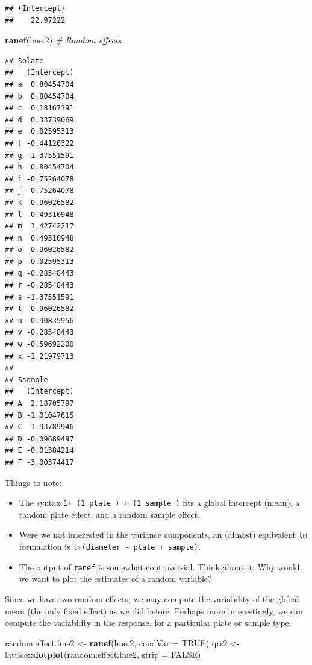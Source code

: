 \documentclass[]{book}
\newenvironment{Shaded}{\begin{snugshade}}{\end{snugshade}}
\newcommand{\KeywordTok}[1]{\textcolor[rgb]{0.13,0.29,0.53}{\textbf{#1}}}
\newcommand{\DataTypeTok}[1]{\textcolor[rgb]{0.13,0.29,0.53}{#1}}
\newcommand{\DecValTok}[1]{\textcolor[rgb]{0.00,0.00,0.81}{#1}}
\newcommand{\StringTok}[1]{\textcolor[rgb]{0.31,0.60,0.02}{#1}}
\newcommand{\CommentTok}[1]{\textcolor[rgb]{0.56,0.35,0.01}{\textit{#1}}}
\newcommand{\OtherTok}[1]{\textcolor[rgb]{0.56,0.35,0.01}{#1}}
\newcommand{\OperatorTok}[1]{\textcolor[rgb]{0.81,0.36,0.00}{\textbf{#1}}}
\newcommand{\NormalTok}[1]{#1}
\providecommand{\tightlist}{%
  \setlength{\itemsep}{0pt}\setlength{\parskip}{0pt}}
\theoremstyle{definition}
\theoremstyle{definition}
\theoremstyle{definition}
\theoremstyle{remark}
\begin{document}
\begin{verbatim}
## (Intercept) 
##    22.97222
\end{verbatim}

\begin{Shaded}
\begin{Highlighting}[]
\KeywordTok{ranef}\NormalTok{(lme.}\DecValTok{2}\NormalTok{) }\CommentTok{# Random effects}
\end{Highlighting}
\end{Shaded}

\begin{verbatim}
## $plate
##   (Intercept)
## a  0.80454704
## b  0.80454704
## c  0.18167191
## d  0.33739069
## e  0.02595313
## f -0.44120322
## g -1.37551591
## h  0.80454704
## i -0.75264078
## j -0.75264078
## k  0.96026582
## l  0.49310948
## m  1.42742217
## n  0.49310948
## o  0.96026582
## p  0.02595313
## q -0.28548443
## r -0.28548443
## s -1.37551591
## t  0.96026582
## u -0.90835956
## v -0.28548443
## w -0.59692200
## x -1.21979713
## 
## $sample
##   (Intercept)
## A  2.18705797
## B -1.01047615
## C  1.93789946
## D -0.09689497
## E -0.01384214
## F -3.00374417
\end{verbatim}

Things to note:

\begin{itemize}
\tightlist
\item
  The syntax
  \texttt{1+\ (1\textbar{}\ plate\ )\ +\ (1\textbar{}\ sample\ )} fits a
  global intercept (mean), a random plate effect, and a random sample
  effect.
\item
  Were we not interested in the variance components, an (almost)
  equivalent \texttt{lm} formulation is
  \texttt{lm(diameter\ \textasciitilde{}\ plate\ +\ sample)}.
\item
  The output of \texttt{ranef} is somewhat controversial. Think about
  it: Why would we want to plot the estimates of a random variable?
\end{itemize}

Since we have two random effects, we may compute the variability of the
global mean (the only fixed effect) as we did before. Perhaps more
interestingly, we can compute the variability in the response, for a
particular plate or sample type.

\begin{Shaded}
\begin{Highlighting}[]
\NormalTok{random.effect.lme2 <-}\StringTok{ }\KeywordTok{ranef}\NormalTok{(lme.}\DecValTok{2}\NormalTok{, }\DataTypeTok{condVar =} \OtherTok{TRUE}\NormalTok{) }
\NormalTok{qrr2 <-}\StringTok{ }\NormalTok{lattice}\OperatorTok{::}\KeywordTok{dotplot}\NormalTok{(random.effect.lme2, }\DataTypeTok{strip =} \OtherTok{FALSE}\NormalTok{)}
\end{Highlighting}
\end{Shaded}
\end{document}
